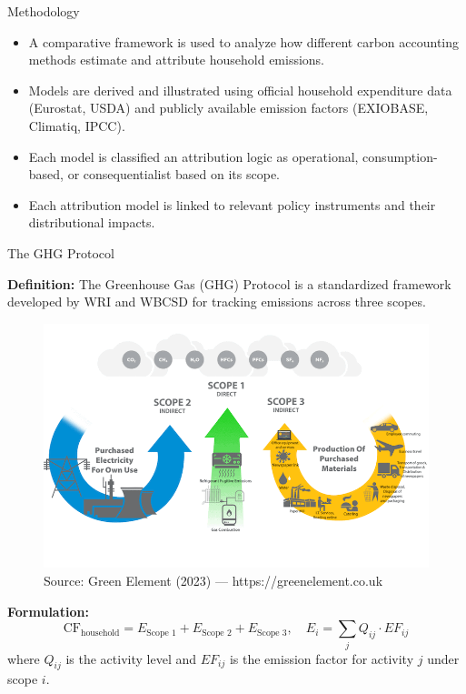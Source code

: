 \documentclass{beamer}
\begin{document}
\begin{frame}{Methodology}
\footnotesize
\begin{itemize}
\item A comparative framework is used to analyze how different carbon accounting methods estimate and attribute household emissions.
\item Models are derived and illustrated using official household expenditure data (Eurostat, USDA) and publicly available emission factors (EXIOBASE, Climatiq, IPCC).
\item Each model is classified an attribution logic as operational, consumption-based, or consequentialist based on its scope.
\item Each attribution model is linked to relevant policy instruments and their distributional impacts.
\end{itemize}
\end{frame}


\begin{frame}{The GHG Protocol}
\small
\vspace{-2.5em}

\footnotesize \textbf{Definition:}  
The Greenhouse Gas (GHG) Protocol is a standardized framework developed by WRI and WBCSD for tracking emissions across three scopes.
\vspace{-0.5em}
\begin{figure}[h]
  \centering
  \includegraphics[width=0.55\linewidth]{ghg scope.png}
  \caption*{\tiny Source: Green Element (2023) — https://greenelement.co.uk}
\end{figure}
\vspace{-1.0em}
\footnotesize \textbf{Formulation:}
\[
\text{CF}_{\text{household}} = E_{\text{Scope 1}} + E_{\text{Scope 2}} + E_{\text{Scope 3}}, \quad 
E_i = \sum_j Q_{ij} \cdot EF_{ij}
\]
{\footnotesize where $Q_{ij}$ is the activity level and $EF_{ij}$ is the emission factor for activity $j$ under scope $i$.}

\end{frame}
\end{document}
